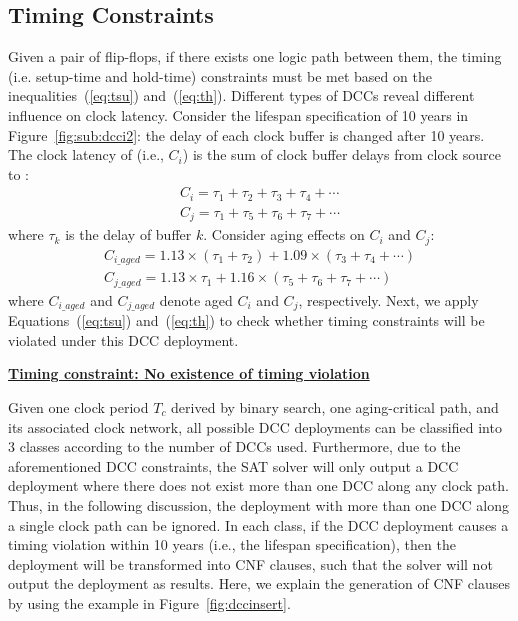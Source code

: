 \subsection{Timing Constraints}
\label{subsec:tccc}
Given a pair of flip-flops, if there exists one logic path between them, the timing (i.e. setup-time and hold-time) constraints must be met based on the inequalities~(\ref{eq:tsu}) and~(\ref{eq:th}). Different types of DCCs reveal different influence on clock latency. Consider the lifespan specification of 10 years in Figure~\ref{fig:sub:dcci2}: the delay of each clock buffer is changed after 10 years. The clock latency of  (i.e., $C_i$) is the sum of clock buffer delays from clock source to : 
\begin{gather*}
C_i = \tau_1 + \tau_2 + \tau_3 + \tau_4 +\dotsb \\
C_j = \tau_1 + \tau_5 + \tau_6 + \tau_7 +\dotsb
\end{gather*}
where $\tau_k$ is the delay of buffer $k$. Consider aging effects on $C_i$ and $C_j$: 
\begin{gather*}
C_{i\_aged} = 1.13 \times \left(\tau_1 + \tau_2\right) + 1.09 \times \left(\tau_3 + \tau_4 + \dotsb\right)\\
C_{j\_aged} = 1.13 \times \tau_1+ 1.16 \times \left( \tau_5 + \tau_6 + \tau_7 + \dotsb \right)
\end{gather*}
where $C_{i\_aged}$ and $C_{j\_aged}$ denote aged $C_i$ and $C_j$, respectively. Next, we apply Equations~(\ref{eq:tsu}) and~(\ref{eq:th}) to check whether timing constraints will be violated under this DCC deployment.

\noindent \textbf{\uline{Timing constraint: No existence of timing violation}}

Given one clock period $T_c$ derived by binary search, one aging-critical path, and its associated clock network, all possible DCC deployments can be classified into 3 classes according to the number of DCCs used. Furthermore, due to the aforementioned DCC constraints, the SAT solver will only output a DCC deployment where there does not exist more than one DCC along any clock path. Thus, in the following discussion, the deployment with more than one DCC along a single clock path can be ignored. In each class, if the DCC deployment causes a timing violation within 10 years (i.e., the lifespan specification), then the deployment will be transformed into CNF clauses, such that the solver will not output the deployment as results. Here, we explain the generation of CNF clauses by using the example in Figure~\ref{fig:dccinsert}.\\

